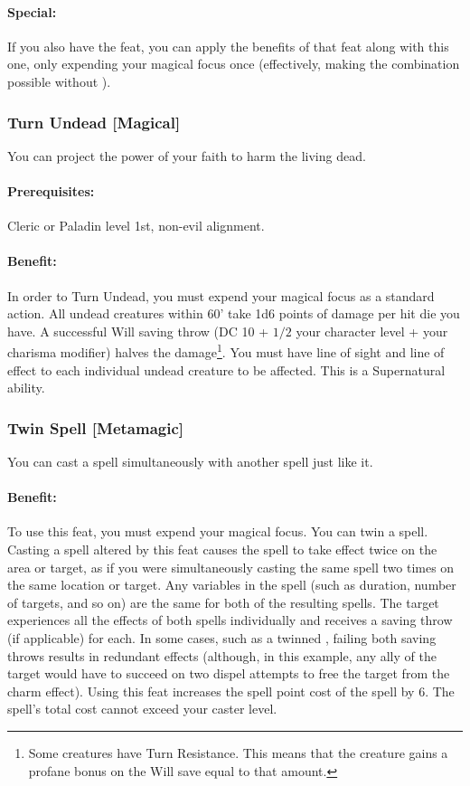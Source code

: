\paragraph{Special:} If you also have the  feat, you can apply the benefits of that feat along with this one, only expending your magical focus once 
(effectively, making the combination possible without ).
\subsubsection[Turn Undead]{Turn Undead [Magical]}
\label{Feat:TurnUndead}
You can project the power of your faith to harm the living dead.

\paragraph{Prerequisites:} Cleric or Paladin level 1st, non-evil alignment.

\paragraph{Benefit:} In order to Turn Undead, you must expend your magical focus as a standard action.
All undead creatures within 60' take 1d6 points of damage per hit die you have. 
A successful Will saving throw (DC 10 + $1/2$ your character level + your charisma modifier) halves the damage\footnote{
Some creatures have Turn Resistance. This means that the creature gains a profane bonus on the Will save equal to that amount.}.
You must have line of sight and line of effect to each individual undead creature to be affected. This is a Supernatural ability.
\subsubsection[Twin Spell]{Twin Spell [Metamagic]}
\label{Feat:TwinSpell}
You can cast a spell simultaneously with another spell just like it.

\paragraph{Benefit:} To use this feat, you must expend your magical focus. 
You can twin a spell. Casting a spell altered by this feat causes the spell to take effect twice on the area or target, 
as if you were simultaneously casting the same spell two times on the same location or target. 
Any variables in the spell (such as duration, number of targets, and so on) are the same for both of the resulting spells. 
The target experiences all the effects of both spells individually and receives a saving throw (if applicable) for each. 
In some cases, such as a twinned , failing both saving throws results in redundant effects 
(although, in this example, any ally of the target would have to succeed on two dispel attempts to free the target from the charm effect).
Using this feat increases the spell point cost of the spell by 6. The spell's total cost cannot exceed your caster level.

